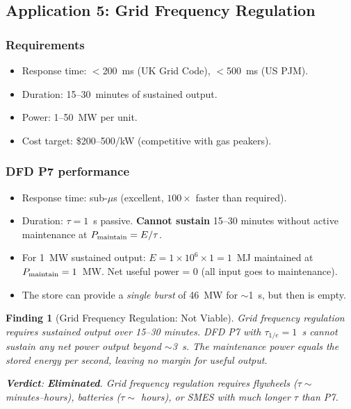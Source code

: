 \documentclass[11pt]{article}
\newtheorem{finding}{Finding}
\newcommand{\ee}[1]{\times 10^{#1}}
\begin{document}
\subsection{Application 5: Grid Frequency Regulation}

\subsubsection{Requirements}
\begin{itemize}[nosep]
  \item Response time: $<$200~ms (UK Grid Code), $<$500~ms (US PJM).
  \item Duration: 15--30~minutes of sustained output.
  \item Power: 1--50~MW per unit.
  \item Cost target: \$200--500/kW (competitive with gas peakers).
\end{itemize}

\subsubsection{DFD P7 performance}
\begin{itemize}[nosep]
  \item Response time: sub-$\mu$s (excellent, $100\times$ faster than
    required).
  \item Duration: $\tau = 1$~s passive. \textbf{Cannot sustain} 15--30
    minutes without active maintenance at $P_{\rm maintain} = E/\tau$.
  \item For 1~MW sustained output: $E = 1\ee{6}\times 1 = 1$~MJ
    maintained at $P_{\rm maintain} = 1$~MW. Net useful power = 0
    (all input goes to maintenance).
  \item The store can provide a \emph{single burst} of 46~MW for
    $\sim$1~s, but then is empty.
\end{itemize}

\begin{finding}[Grid Frequency Regulation: Not Viable]
\label{find:grid-freq}
Grid frequency regulation requires sustained output over 15--30 minutes.
DFD P7 with $\tau_{1/e} = 1$~s cannot sustain any net power output
beyond $\sim$3~s. The maintenance power equals the stored energy per
second, leaving no margin for useful output.

\textbf{Verdict}: \textbf{Eliminated}. Grid frequency regulation
requires flywheels ($\tau \sim$ minutes--hours), batteries ($\tau \sim$
hours), or SMES with much longer $\tau$ than P7.
\end{finding}
\end{document}
